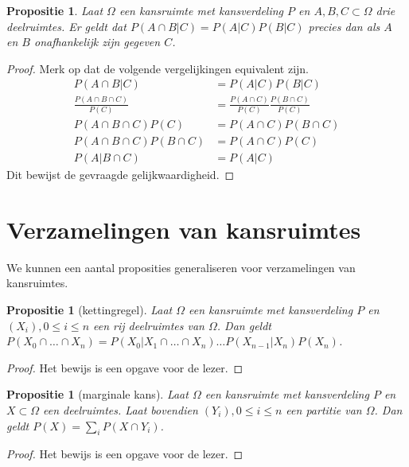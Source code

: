 \documentclass[a4paper]{report}
\newtheorem{proposition}[theorem]{Propositie}
\theoremstyle{definition}
\begin{document}
\begin{proposition}
    Laat $\Omega$ een kansruimte met kansverdeling $P$ en $A,B,C \subset \Omega$ drie deelruimtes.
    Er geldt dat $P(A \cap B|C) = P(A|C)P(B|C)$ precies dan als $A$ en $B$ onafhankelijk zijn gegeven $C$.
\end{proposition}
\begin{proof}
    Merk op dat de volgende vergelijkingen equivalent zijn.
    \begin{align*}
        P(A \cap B|C)                       &= P(A|C)P(B|C) \\
        \frac{P(A \cap B \cap C)}{P(C)}     &= \frac{P(A \cap C)}{P(C)} \frac{P(B \cap C)}{P(C)} \\
        P(A \cap B \cap C)P(C)              &= P(A \cap C)P(B \cap C) \\
        P(A \cap B \cap C)P(B \cap C)       &= P(A \cap C)P(C) \\
        P(A | B \cap C)                     &= P(A | C)
    \end{align*}
    Dit bewijst de gevraagde gelijkwaardigheid.
\end{proof}



\section{Verzamelingen van kansruimtes}
We kunnen een aantal proposities generaliseren voor verzamelingen van kansruimtes.

\begin{proposition}[kettingregel]
    Laat $\Omega$ een kansruimte met kansverdeling $P$ en $(X_i), 0 \leq i \leq n$ een rij deelruimtes van $\Omega$.
    Dan geldt $P(X_0 \cap \dots \cap X_n) = P(X_0|X_1 \cap \dots \cap X_n) \dots P(X_{n-1}|X_n)P(X_n)$.
\end{proposition}
\begin{proof}
    Het bewijs is een opgave voor de lezer.
\end{proof}

\begin{proposition}[marginale kans]
    Laat $\Omega$ een kansruimte met kansverdeling $P$ en $X \subset \Omega$ een deelruimtes.
    Laat bovendien $(Y_i), 0 \leq i \leq n$ een partitie van $\Omega$.
    Dan geldt $P(X) = \sum_{i} P(X \cap Y_i)$.
\end{proposition}
\begin{proof}
    Het bewijs is een opgave voor de lezer.
\end{proof}
\end{document}
